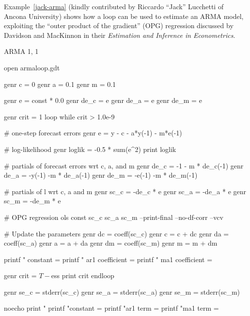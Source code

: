 Example~\ref{jack-arma} (kindly contributed by Riccardo ``Jack''
Lucchetti of Ancona University) shows how a loop can be used to
estimate an ARMA model, exploiting the ``outer product of the
gradient'' (OPG) regression discussed by Davidson and MacKinnon in
their \emph{Estimation and Inference in Econometrics}.

\begin{script}[htbp]
  \caption{ARMA 1, 1}
  \label{jack-arma}

\begin{code}
	open armaloop.gdt

	genr c = 0
	genr a = 0.1
	genr m = 0.1

	genr e = const * 0.0
	genr de_c = e
	genr de_a = e
	genr de_m = e

	genr crit = 1
	loop while crit > 1.0e-9

	   # one-step forecast errors
	   genr e = y - c - a*y(-1) - m*e(-1)  

	   # log-likelihood 
	   genr loglik = -0.5 * sum(e^2)
	   print loglik

	   # partials of forecast errors wrt c, a, and m
	   genr de_c = -1 - m * de_c(-1) 
	   genr de_a = -y(-1) -m * de_a(-1)
	   genr de_m = -e(-1) -m * de_m(-1)
   
	   # partials of l wrt c, a and m
	   genr sc_c = -de_c * e
	   genr sc_a = -de_a * e
	   genr sc_m = -de_m * e
   
	   # OPG regression
	   ols const sc_c sc_a sc_m --print-final --no-df-corr --vcv

	   # Update the parameters
	   genr dc = coeff(sc_c) 
	   genr c = c + dc
	   genr da = coeff(sc_a) 
	   genr a = a + da
	   genr dm = coeff(sc_m) 
	   genr m = m + dm

	   printf "  constant        = %
	   printf "  ar1 coefficient = %
	   printf "  ma1 coefficient = %

	   genr crit = $T - $ess
	   print crit
	endloop

	genr se_c = stderr(sc_c)
	genr se_a = stderr(sc_a)
	genr se_m = stderr(sc_m)

	noecho
	print "
	printf "constant = %
	printf "ar1 term = %
	printf "ma1 term = %
\end{code}
\end{script}



